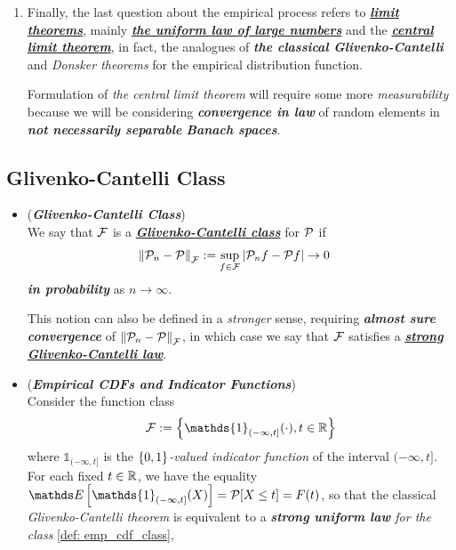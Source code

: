 \documentclass[11pt]{article}
\begin{document}
\begin{itemize}
\begin{remark}
\begin{enumerate}
\item Finally, the last question about the empirical process refers to \underline{\emph{\textbf{limit theorems}}}, mainly \underline{\emph{\textbf{the uniform law of large numbers}}} and the \underline{\emph{\textbf{central limit theorem}}}, in fact, the analogues of \emph{\textbf{the classical Glivenko-Cantelli}} and \emph{Donsker theorems} for the empirical distribution function.

Formulation of \emph{the central limit theorem} will require some more \emph{measurability} because we will be considering \emph{\textbf{convergence in law}} of random elements in \emph{\textbf{not necessarily separable} \textbf{Banach spaces}}.
\end{enumerate}
\end{remark}
\end{itemize}
\subsection{Glivenko-Cantelli Class}
\begin{itemize}
\item \begin{definition} (\textbf{\emph{Glivenko-Cantelli Class}}) \citep{wellner2013weak, wainwright2019high, gine2021mathematical}\\
We say that ${\mathcal F}$ is a \underline{\emph{\textbf{Glivenko-Cantelli class}}} for ${\mathcal P}$ if 
\begin{align*}
\left\|{\mathcal P}_n  - {\mathcal P}\right\|_{{\mathcal F}} &:= \sup_{f \in {\mathcal F}}\left\lvert {\mathcal P}_n f - {\mathcal P} f \right\rvert \to 0
\end{align*}  \emph{\textbf{in probability}} as $n \to \infty$. 

This notion can also be defined in a \emph{stronger} sense, requiring \emph{\textbf{almost sure convergence}} of $\left\|{\mathcal P}_n  - {\mathcal P}\right\|_{{\mathcal F}}$, in which case we say that ${\mathcal F}$ satisfies a \underline{\emph{\textbf{strong Glivenko-Cantelli law}}}.
\end{definition}

\item \begin{example} (\textbf{\emph{Empirical CDFs and Indicator Functions}}) \\
Consider the function class
\begin{align}
\cF := \set{\mathds{1}_{(-\infty, t]}(\cdot), t \in \bR}  \label{def: emp_cdf_class}
\end{align}
where $\mathds{1}_{(-\infty, t]}$ is the \emph{$\left\{0, 1\right\}$-valued indicator function} of the interval $(-\infty, t]$. For each fixed $t \in {\mathbb R}$, we have the equality $ \E{}{\mathds{1}_{(-\infty, t]}(X)} = \cP[X \le t] = F(t)$, so that the classical \emph{Glivenko-Cantelli theorem} is equivalent to a \emph{\textbf{strong uniform law} for the class} \eqref{def: emp_cdf_class},
\end{example}
\end{itemize}
\end{document}
